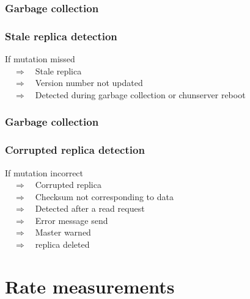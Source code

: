 \documentclass{beamer}
\begin{document}
\begin{frame}
 \frametitle{Garbage collection}
 \frametitle{Stale replica detection}
 If mutation missed\\
 ~~$\Rightarrow$~~Stale replica\\
 ~~$\Rightarrow$~~Version number not updated\\
 ~~$\Rightarrow$~~Detected during garbage collection or chunserver reboot
\end{frame}

\begin{frame}
 \frametitle{Garbage collection}
 \frametitle{Corrupted replica detection}
 If mutation incorrect\\
 ~~$\Rightarrow$~~Corrupted replica\\
 ~~$\Rightarrow$~~Checksum not corresponding to data\\
 ~~$\Rightarrow$~~Detected after a read request\\
 ~~$\Rightarrow$~~Error message send\\
 ~~$\Rightarrow$~~Master warned\\
 ~~$\Rightarrow$~~replica deleted
\end{frame}

\section{Rate measurements}
\end{document}
